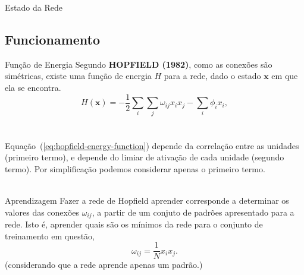 \begin{frame}{Estado da Rede}%
  \justifying%
\end{frame}

\subsection{Funcionamento}
\begin{frame}{Função de Energia}%
  \justifying%
  Segundo \textbf{HOPFIELD (1982)}, como as conexões são simétricas, existe uma função de energia $H$ para a rede, dado o estado $\mathrm{\mathbf{x}}$ em que ela se encontra.
  \begin{equation}%
    \label{eq:hopfield-energy-function}%
    H(\mathbf{x}) = - \frac{1}{2} \sum_{i} \sum_{j} \omega_{ij} x_{i} x_{j} - \sum_{i} \phi_{i} x_{i},
  \end{equation}
  \\~\\
  Equação~(\ref{eq:hopfield-energy-function}) depende da correlação entre as unidades (primeiro termo), e depende do limiar de ativação de cada unidade (segundo termo). Por simplificação podemos considerar apenas o primeiro termo.
  \\~\\
\end{frame}

\begin{frame}{Aprendizagem}%
  \justifying%
  Fazer a rede de Hopfield aprender corresponde a determinar os valores das conexões $\omega_{ij}$, a partir de um conjuto de padrões apresentado para a rede. Isto é, aprender quais são os mínimos da rede para o conjunto de treinamento em questão,
  \begin{equation}%
    \label{eq:hop-omega}
    \omega_{ij} = \frac{1}{N} x_{i} x_{j}.
  \end{equation}
  (considerando que a rede aprende apenas um padrão.)
\end{frame}

